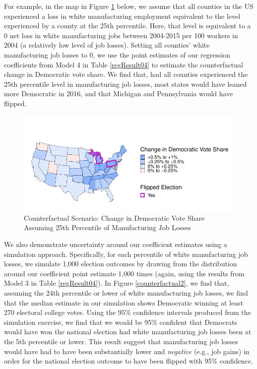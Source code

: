 \documentclass[]{AEA}
\begin{document}
For example, in the map in Figure \ref{counterfactual1} below, we assume
that all counties in the US experienced a loss in white manufacturing
employment equivalent to the level experienced by a county at the 25th
percentile. Here, that level is equivalent to a 0 net loss in white
manufacturing jobs between 2004-2015 per 100 workers in 2004 (a
relatively low level of job losses). Setting all counties' white
manufacturing job losses to 0, we use the point estimates of our
regression coefficients from Model 4 in Table \ref{regResult04} to
estimate the counterfactual change in Democratic vote share. We find
that, had all counties experienced the 25th percentile level in
manufacturing job losses, most states would have leaned more Democratic
in 2016, and that Michigan and Pennsylvania would have flipped.

\FloatBarrier
\begin{figure} 
\caption{Counterfactual Scenario: Change in Democratic Vote Share Assuming 25th Percentile of Manufacturing Job Losses}
\label{counterfactual1}

\begin{center}\includegraphics{Final-Draft_files/figure-latex/unnamed-chunk-6-1} \end{center}



\FloatBarrier
\end{figure}
\FloatBarrier

We also demonstrate uncertainty around our coefficient estimates using a
simulation approach. Specifically, for each percentile of white
manufacturing job losses, we simulate 1,000 election outcomes by drawing
from the distribution around our coefficient point estimate 1,000 times
(again, using the results from Model 3 in Table \ref{regResult04}). In
Figure \ref{counterfactual2}, we find that, assuming the 24th percentile
or lower of white manufacturing job losses, we find that the median
estimate in our simulation shows Democratic winning at least 270
electoral college votes. Using the 95\% confidence intervals produced
from the simulation exercise, we find that we would be 95\% confident
that Democrats would have won the national election had white
manufacturing job losses been at the 5th percentile or lower. This
result suggest that manufacturing job losses would have had to have been
substantially lower and \emph{negative} (e.g., job gains) in order for
the national election outcome to have been flipped with 95\% confidence.
\end{document}
